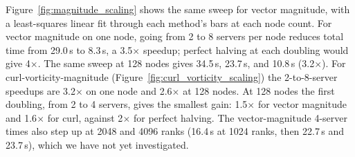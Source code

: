 Figure~\ref{fig:magnitude_scaling} shows the same sweep for vector magnitude, with a least-squares linear fit through each method's bars at each node count. For vector magnitude on one node, going from 2 to 8 servers per node reduces total time from 29.0\,s to 8.3\,s, a 3.5$\times$ speedup; perfect halving at each doubling would give 4$\times$. The same sweep at 128 nodes gives 34.5\,s, 23.7\,s, and 10.8\,s (3.2$\times$). For curl-vorticity-magnitude (Figure~\ref{fig:curl_vorticity_scaling}) the 2-to-8-server speedups are 3.2$\times$ on one node and 2.6$\times$ at 128 nodes. At 128 nodes the first doubling, from 2 to 4 servers, gives the smallest gain: 1.5$\times$ for vector magnitude and 1.6$\times$ for curl, against 2$\times$ for perfect halving. The vector-magnitude 4-server times also step up at 2048 and 4096 ranks (16.4\,s at 1024 ranks, then 22.7\,s and 23.7\,s), which we have not yet investigated. 

